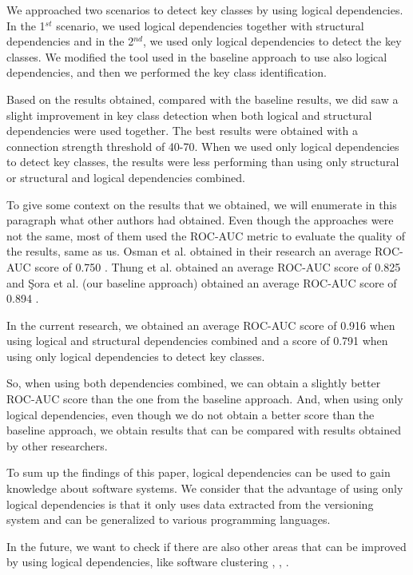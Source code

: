 \documentclass[runningheads]{comsis2}
\begin{document}
We approached two scenarios to detect key classes by using logical dependencies. In the 1$^{st}$ scenario, we used logical dependencies together with structural dependencies and in the 2$^{nd}$, we used only logical dependencies to detect the key classes. We modified the tool used in the baseline approach to use also logical dependencies, and then we performed the key class identification.

Based on the results obtained, compared with the baseline results, we did saw a slight improvement in key class detection when both logical and structural dependencies were used together. The best results were obtained with a connection strength threshold of 40-70. When we used only logical dependencies to detect key classes, the results were less performing than using only structural or structural and logical dependencies combined.

To give some context on the results that we obtained, we will enumerate in this paragraph what other authors had obtained. Even though the approaches were not the same, most of them used the ROC-AUC metric to evaluate the quality of the results, same as us.
Osman et al. obtained in their research an average ROC-AUC score of 0.750 \cite{6676885}. Thung et al. obtained an average ROC-AUC score of 0.825 \cite{rocclasification} and Şora et al. (our baseline approach) obtained an average ROC-AUC score of 0.894 \cite{Finding-key-classes}.

In the current research, we obtained an average ROC-AUC score of 0.916 when using logical and structural dependencies combined and a score of 0.791 when using only logical dependencies to detect key classes.

So, when using both dependencies combined, we can obtain a slightly better ROC-AUC score than the one from the baseline approach. And, when using only logical dependencies, even though we do not obtain a better score than the baseline approach, we obtain results that can be compared with results obtained by other researchers. 

To sum up the findings of this paper, logical dependencies can be used to gain knowledge about software systems. We consider that the advantage of using only logical dependencies is that it only uses data extracted from the versioning system and can be generalized to various programming languages.

In the future, we want to check if there are also other areas that can be improved by using logical dependencies, like software clustering \cite{SoraConti}, \cite{Shtern:2012:CMS:2332427.2332428}, \cite{SoraSem13}.
\end{document}
